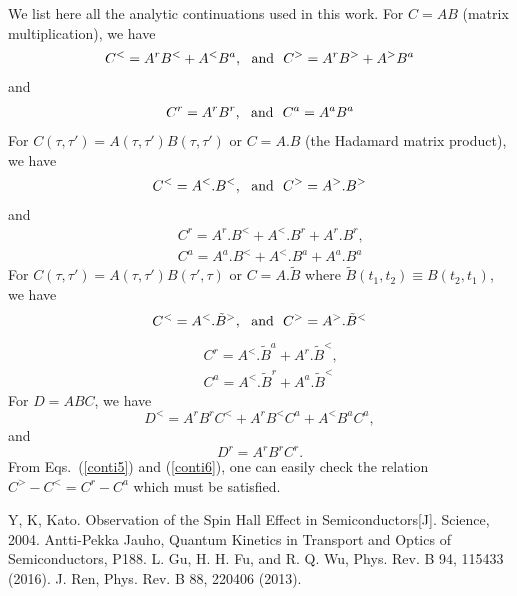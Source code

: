 \documentclass[aps,prb,superscriptaddress]{revtex4-2}
\begin{document}
We list here all the analytic continuations used in this work.  For $C = AB$ (matrix multiplication), we have\cite{jauho}
\begin{gather}
C^< = A^r B^< + A^< B^a, ~~ {\rm and } ~~ C^> = A^r B^> + A^> B^a \label{conti1}
\end{gather}
and
\begin{gather}
C^r = A^r B^r , ~~ {\rm and } ~~ C^a =  A^a B^a \label{conti2}
\end{gather}
For $C(\tau,\tau') = A(\tau,\tau') B(\tau,\tau')$ or $C=A.B$ (the Hadamard matrix product), we have\cite{jauho}
\begin{gather}
C^< = A^<. B^< , ~~ {\rm and } ~~ C^> = A^> .B^> \label{conti3}
\end{gather}
and
\begin{eqnarray}
&&C^r = A^r .B^< + A^< .B^r + A^r .B^r, \nonumber \\
&& C^a = A^a .B^< + A^< .B^a + A^a. B^a \label{conti4}
\end{eqnarray}
For $C(\tau,\tau') = A(\tau,\tau') B(\tau',\tau)$ or $C = A.{\tilde B}$ where ${\tilde B}(t_1,t_2) \equiv B(t_2,t_1)$, we have\cite{jauho}
\begin{gather}
C^< = A^< .{\tilde B}^> , ~~ {\rm and } ~~ C^> = A^> .{\tilde B}^< \label{conti5}
\end{gather}
\begin{eqnarray}
&& C^r = A^< .{\tilde B}^a + A^r .{\tilde B}^< , \nonumber \\
&& C^a = A^< .{\tilde B}^r + A^a .{\tilde B}^<  \label{conti6}
\end{eqnarray}
For $D=ABC$, we have
\begin{equation}
D^{<}=A^r B^r C^{<}+A^r B^{<} C^a+A^{<} B^a C^a,
\end{equation}
and 
\begin{equation}
D^r=A^r B^r C^r.
\end{equation}
From Eqs.~(\ref{conti5}) and (\ref{conti6}), one can easily check the relation $C^> - C^< = C^r - C^a$ which must be satisfied.


\begin{thebibliography}{10}
Y, K, Kato. Observation of the Spin Hall Effect in Semiconductors[J]. Science, 2004.
Antti-Pekka Jauho, Quantum Kinetics in Transport and Optics of Semiconductors, P188.
 L. Gu, H. H. Fu, and R. Q. Wu, Phys. Rev. B 94, 115433 (2016).
 J. Ren, Phys. Rev. B 88, 220406 (2013).
\end{thebibliography}


\end{document}
